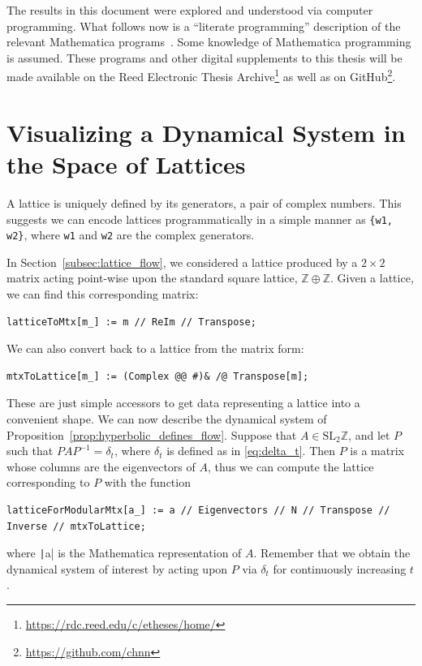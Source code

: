 \documentclass[12pt,twoside]{reedthesis}
\theoremstyle{definition}
\newcommand{\Z}{\mathbb{Z}}
\newcommand{\SLZ}{\mathrm{SL}_2{\Z}}
\begin{document}
The results in this document were explored and understood via computer programming.
What follows now is a ``literate programming'' description of the relevant Mathematica programs~\cite{knuth1992}.
Some knowledge of Mathematica programming is assumed.
These programs and other digital supplements to this thesis will be made available on the Reed Electronic Thesis Archive\footnote{\url{https://rdc.reed.edu/c/etheses/home/}} as well as on GitHub\footnote{\url{https://github.com/chnn}}.

\newpage

\section{Visualizing a Dynamical System in the Space of Lattices}

A lattice is uniquely defined by its generators, a pair of complex numbers.
This suggests we can encode lattices programmatically in a simple manner as \texttt{\{w1, w2\}}, where \texttt{w1} and \texttt{w2} are the complex generators. 

In Section~\ref{subsec:lattice_flow}, we considered a lattice produced by a $2 \times 2$ matrix acting point-wise upon the standard square lattice, $\Z \oplus \Z$.
Given a lattice, we can find this corresponding matrix:
\begin{verbatim}
latticeToMtx[m_] := m // ReIm // Transpose;
\end{verbatim}
We can also convert back to a lattice from the matrix form:
\begin{verbatim}
mtxToLattice[m_] := (Complex @@ #)& /@ Transpose[m];
\end{verbatim}
These are just simple accessors to get data representing a lattice into a convenient shape.
We can now describe the dynamical system of Proposition~\ref{prop:hyperbolic_defines_flow}.
Suppose that $A \in \SLZ$, and let $P$ such that $PAP^{-1} = \delta_t$, where $\delta_t$ is defined as in \eqref{eq:delta_t}.
Then $P$ is a matrix whose columns are the eigenvectors of $A$, thus we can compute the lattice corresponding to $P$ with the function 
\begin{verbatim}
latticeForModularMtx[a_] := a // Eigenvectors // N // Transpose // Inverse // mtxToLattice;
\end{verbatim}
where \texttt|a| is the Mathematica representation of $A$.
Remember that we obtain the dynamical system of interest by acting upon $P$ via $\delta_t$ for continuously increasing $t$.
\end{document}
